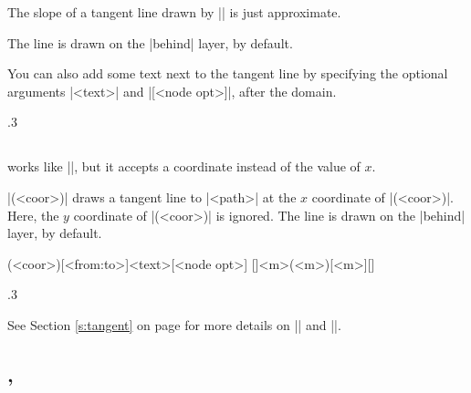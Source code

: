 \remark
The slope of a tangent line drawn by |\tztangentat| is just approximate.

The line is drawn on the |behind| layer, by default.

You can also add some text next to the tangent line by specifying the optional arguments |{<text>}| and |[<node opt>]|, after the domain.

\begin{tzcode}{.3}
\end{tzcode}

\subsection{\protect\cmd{\tztangent}}
\label{ssi:tztangent}

\icmd{\tztangent} works like |\tztangentat|, but it accepts a coordinate instead of the value of $x$.

|(<coor>)| draws a tangent line to |<path>| at the $x$ coordinate of |(<coor>)|. Here, the $y$ coordinate of |(<coor>)| is ignored. The line is drawn on the |behind| layer, by default.


\begin{tzdef}{}
(<coor>)[<from:to>]{<text>}[<node opt>]
  []{<m>}(<m>)[<m>]{}[]
\end{tzdef}

\begin{tzcode}{.3}
\end{tzcode}


See Section \ref{s:tangent} on page \pageref{s:tangent} for more details on |\tztangent| and |\tztangentat|.


\subsection{\protect\cmd{\tzsecantat}, \protect\cmd{\tzsecant}}
\label{ssi:tzsecant}

